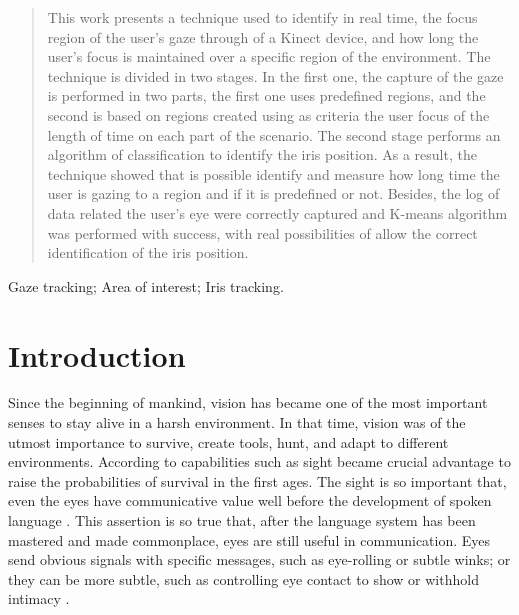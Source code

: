 \documentclass[10pt, conference]{IEEEtran}
\begin{document}
\maketitle



\begin{abstract}
	This work presents a technique used to identify in real time, the focus region of the user's gaze through of a Kinect device, and how long the user’s focus is maintained over a specific region of the environment. The technique is divided in two stages. In the first one, the capture of the gaze is performed in two parts, the first one uses predefined regions, and the second is based on regions created using as criteria the user focus of the length of time on each part of the scenario. The second stage performs an algorithm of classification to identify the iris position. As a result, the technique showed that is possible identify and measure how long time the user is gazing to a region and if it is predefined or not. Besides, the log of data related the user's eye were correctly captured and K-means algorithm was performed with success, with real possibilities of allow the correct identification of the iris position.
\end{abstract}

\begin{IEEEkeywords}
	Gaze tracking; Area of interest; Iris tracking.
\end{IEEEkeywords}


\IEEEpeerreviewmaketitle

\section{Introduction}

	Since the beginning of mankind, vision has became one of the most important senses to stay alive in a harsh environment. 
	In that time, vision was of the utmost importance to survive, create tools, hunt, and adapt to different environments. 
	According to \cite{1} capabilities such as sight became crucial advantage to raise the probabilities of survival in the first ages.
	The sight is so important that, even the eyes have communicative value well before the development of spoken language \cite{2}.
	This assertion is so true that, after the language system has been mastered and made commonplace, eyes are still useful in communication. 
	Eyes send obvious signals with specific messages, such as eye-rolling or subtle winks; or they can be more subtle, such as controlling eye contact to show or withhold intimacy \cite{3}.
\end{document}

